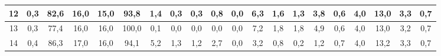 \begin{sidewaystable}[]
\begin{tabular}{|c|c|c|c|c|c|c|c|c|c|c|c|c|c|c|c|c|c|c|c|}
    12 & 0,3                                              & 82,6                                            & 16,0                                            & 15,0                                            & 93,8                                            & 1,4                                             & 0,3                                             & 0,3                                             & 0,8                                             & 0,0                                             & 6,3                                              & 1,6                                              & 1,3                                              & 3,8                                              & 0,6                                              & 4,0                                              & 13,0                                             & 3,3                                              & 0,7                                              \\ \hline
    13 & 0,3                                              & 77,4                                            & 16,0                                            & 16,0                                            & 100,0                                           & 0,1                                             & 0,0                                             & 0,0                                             & 0,0                                             & 0,0                                             & 7,2                                              & 1,8                                              & 1,8                                              & 4,9                                              & 0,6                                              & 4,0                                              & 13,0                                             & 3,2                                              & 0,7                                              \\ \hline
    14 & 0,4                                              & 86,3                                            & 17,0                                            & 16,0                                            & 94,1                                            & 5,2                                             & 1,3                                             & 1,2                                             & 2,7                                             & 0,0                                             & 3,2                                              & 0,8                                              & 0,2                                              & 1,2                                              & 0,7                                              & 4,0                                              & 13,2                                             & 3,3                                              & 0,7                                              \\ \hline

\end{tabular}
\end{sidewaystable}
